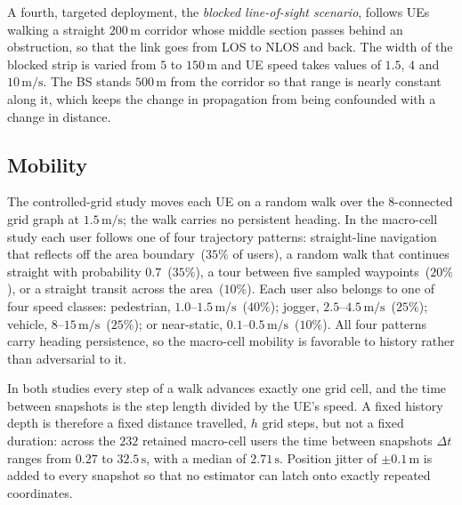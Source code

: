 A fourth, targeted deployment, the \emph{blocked line-of-sight scenario}, follows UEs walking a straight $200\,\text{m}$ corridor whose middle section passes behind an obstruction, so that the link goes from LOS to NLOS and back. The width of the blocked strip is varied from $5$ to $150\,\text{m}$ and UE speed takes values of $1.5$, $4$ and $10\,\text{m/s}$. The BS stands $500\,\text{m}$ from the corridor so that range is nearly constant along it, which keeps the change in propagation from being confounded with a change in distance.

\subsection{Mobility}
\label{subsec:mobility}

The controlled-grid study moves each UE on a random walk over the $8$-connected grid graph at $1.5\,\text{m/s}$; the walk carries no persistent heading. In the macro-cell study each user follows one of four trajectory patterns: straight-line navigation that reflects off the area boundary~($35\%$ of users), a random walk that continues straight with probability $0.7$~($35\%$), a tour between five sampled waypoints~($20\%$), or a straight transit across the area~($10\%$). Each user also belongs to one of four speed classes: pedestrian, $1.0$--$1.5\,\text{m/s}$~($40\%$); jogger, $2.5$--$4.5\,\text{m/s}$~($25\%$); vehicle, $8$--$15\,\text{m/s}$~($25\%$); or near-static, $0.1$--$0.5\,\text{m/s}$~($10\%$). All four patterns carry heading persistence, so the macro-cell mobility is favorable to history rather than adversarial to it.

In both studies every step of a walk advances exactly one grid cell, and the time between snapshots is the step length divided by the UE's speed. A fixed history depth is therefore a fixed distance travelled, $h$ grid steps, but not a fixed duration: across the $232$ retained macro-cell users the time between snapshots $\Delta t$ ranges from $0.27$ to $32.5\,\text{s}$, with a median of $2.71\,\text{s}$. Position jitter of $\pm0.1\,\text{m}$ is added to every snapshot so that no estimator can latch onto exactly repeated coordinates.

